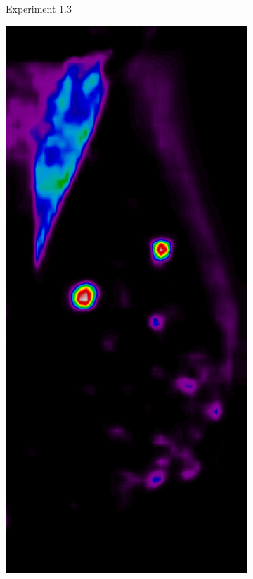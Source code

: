 \begin{figure}[h!]
\begin{subfigure}{0.195\textwidth}
		\caption{Experiment 1.3}
    \end{subfigure}
	\begin{subfigure}{0.195\textwidth}
		\centering
			\includegraphics[width=\textwidth]{plots/examples/example5_probs_2.png}

\end{subfigure}
\end{figure}
